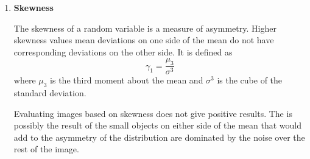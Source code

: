 \begin{enumerate}
\item{\textbf{Skewness}}

The skewness of a random variable is a measure of asymmetry.  Higher skewness values mean deviations on one side of the mean do not have corresponding deviations on the other side.  It is defined as $$\gamma_1=\frac{\mu_3}{\sigma^3}$$ where $\mu_3$ is the third moment about the mean and $\sigma^3$ is the cube of the standard deviation.

Evaluating images based on skewness does not give positive results.  The is possibly the result of the small objects on either side of the mean that would add to the asymmetry of the distribution are dominated by the noise over the rest of the image.


\end{enumerate}


